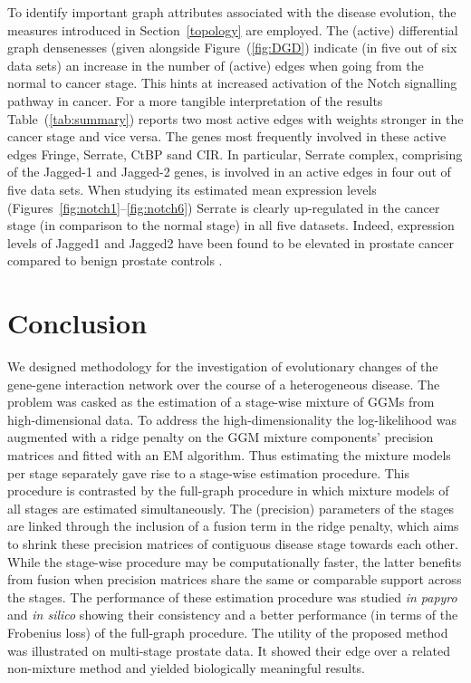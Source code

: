 \documentclass[10pt]{article}
\begin{document}
To identify important graph attributes associated with the disease evolution, the measures introduced in Section~\ref{topology} are employed. The (active) differential graph densenesses (given alongside Figure~(\ref{fig:DGD}) indicate (in five out of six data sets) an increase in the number of (active) edges when going from the normal to cancer stage. This hints at increased activation of the Notch signalling pathway in cancer. For a more tangible interpretation of the results Table~(\ref{tab:summary}) reports two most active edges with weights stronger in the cancer stage and vice versa. The genes most frequently involved in these active edges Fringe, Serrate, CtBP sand CIR. In particular, Serrate complex, comprising of the Jagged-1 and Jagged-2 genes, is involved in an active edges in four out of five data sets. When studying its estimated mean expression levels  (Figures~\ref{fig:notch1}--\ref{fig:notch6}) Serrate is clearly up-regulated in the cancer stage (in comparison to the normal stage) in all five datasets. Indeed, expression levels of Jagged1 and Jagged2 have been found to be elevated in prostate cancer compared to benign prostate controls \citep{santagata2004jagged1,carvalho2014notch}.




\section{Conclusion}
We designed methodology for the investigation of evolutionary changes of the gene-gene interaction network over the course of a heterogeneous disease. The problem was casked as the estimation of a stage-wise mixture of GGMs from high-dimensional data. To address the high-dimensionality the log-likelihood was augmented with a ridge penalty on the GGM mixture components' precision matrices and fitted with an EM algorithm. Thus estimating the mixture models per stage separately gave rise to a stage-wise estimation procedure. This procedure is contrasted by the full-graph procedure in which mixture models of all stages are estimated simultaneously. The (precision) parameters of the stages are linked through the inclusion of a fusion term in the ridge penalty, which aims to shrink these precision matrices of contiguous disease stage towards each other. While the stage-wise procedure may be computationally faster, the latter benefits from fusion when precision matrices share the same or comparable support across the stages. The performance of these estimation procedure was studied \textit{in papyro} and \textit{in silico} showing their consistency and a better performance (in terms of the Frobenius loss) of the full-graph procedure. The utility of the proposed method was illustrated on multi-stage prostate data. It showed their edge over a related non-mixture method and yielded biologically meaningful results. 
\end{document}
